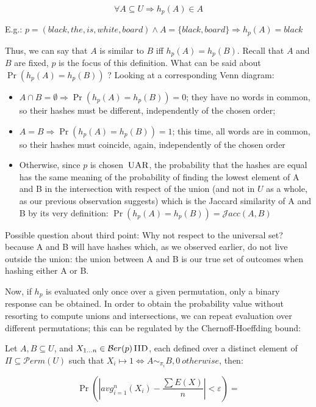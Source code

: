 \documentclass{report}
\newcommand{\berdist}{\mathcal{B}er}
\newcommand{\iid}{\,\textsc{IID}}
\newcommand{\uar}{\,\textsc{UAR}}
\newcommand{\jaccsim}{\mathcal{J}acc}
\newcommand{\coin}{\berdist}
\begin{document}
	\begin{equation}
	\forall A \subseteq U \Rightarrow h_p(A) \in A
	\end{equation}
	
	E.g.: $p = (black, the, is, white, board) \wedge A = \{black, board\} \Rightarrow h_p(A) = black$
	
	Thus, we can say that $A$ is similar to $B$ iff $h_p(A)=h_p(B)$. Recall that $A$ and $B$ are fixed, $p$ is the focus of this definition. What can be said about $\Pr(h_p(A)=h_p(B))$ ? Looking at a corresponding Venn diagram:
	
	\begin{itemize}
	\item $A \cap B = \emptyset \Rightarrow \Pr(h_p(A)=h_p(B)) = 0$; they have no words in common, so their hashes must be different, independently of the chosen order;
	\item $A = B \Rightarrow \Pr(h_p(A)=h_p(B)) = 1$; this time, all words are in common, so their hashes must coincide, again, independently of the chosen order
	\item Otherwise, since $p$ is chosen $\uar$, the probability that the hashes are equal has the same meaning of the probability of finding the lowest element of A and B in the intersection with respect of the union (and not in $U$ as a whole, as our previous observation suggests) which is the Jaccard similarity of A and B by its very definition: $\Pr(h_p(A)=h_p(B)) = \jaccsim(A, B)$
	\end{itemize}
	
	Possible question about third point: Why not respect to the universal set? because A and B will have hashes which, as we observed earlier, do not live outside the union: the union between A and B is our true set of outcomes when hashing either A or B.
	
	Now, if $h_p$ is evaluated only once over a given permutation, only a binary response can be obtained. In order to obtain the probability value without resorting to compute unions and intersections, we can repeat evaluation over different permutations; this can be regulated by the Chernoff-Hoeffding bound:
	
	Let $A, B \subseteq U$, and $X_{1 \dots n} \in \coin(p) \iid$, each defined over a distinct element of $\Pi \subseteq \mathcal{P}erm(U)$ such that $X_i \mapsto 1 \Leftrightarrow A \sim_{\pi_i} B, 0\ otherwise$, then:
	
	\begin{equation}
	\displaystyle \Pr\left(\left|avg_{i=1}^{n}(X_i) - \frac{\sum E(X)}{n}\right|<\varepsilon\right) = 
	\end{equation}
	
\end{document}

